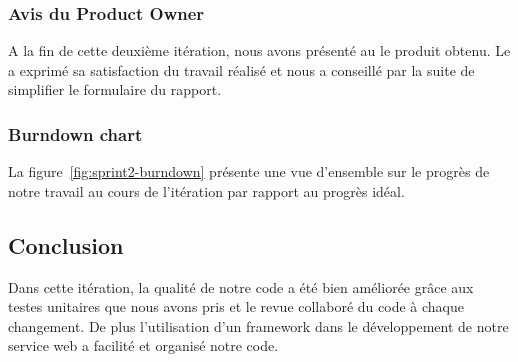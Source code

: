 \subsubsection{Avis du Product Owner}

A la fin de cette deuxième itération, nous avons présenté au  le produit obtenu. Le  a exprimé sa
satisfaction du travail réalisé et nous a conseillé par la suite de simplifier
le formulaire du rapport.

\subsubsection{Burndown chart}

La figure~\ref{fig:sprint2-burndown} présente une vue d'ensemble sur le progrès
de notre travail au cours de l'itération par rapport au progrès idéal.


\subsection{Conclusion}
Dans cette itération, la qualité de notre code a été bien améliorée grâce aux testes unitaires
que nous avons pris et le revue collaboré du code à chaque changement.
De plus l'utilisation d'un framework dans le développement de notre service web
a facilité et organisé notre code.

